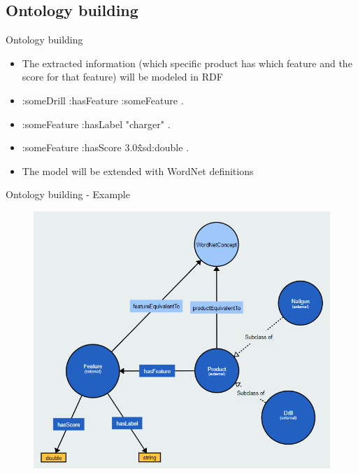 \documentclass{beamer}
\begin{document}
\subsection{Ontology building}
\begin{frame}{Ontology building}
\begin{itemize}
    \item The extracted information (which specific product has which feature and the score for that feature) will be modeled in RDF
    \item :someDrill :hasFeature :someFeature .
    \item :someFeature :hasLabel "charger" .
    \item :someFeature :hasScore 3.0\^\^xsd:double .
    \item The model will be extended with WordNet definitions
\end{itemize}
\end{frame}

\begin{frame}{Ontology building - Example}
    \begin{figure}[htbp]
      \centering
      \includegraphics[scale=0.5]{textentailment.PNG}
    \end{figure}
\end{frame}
\end{document}
